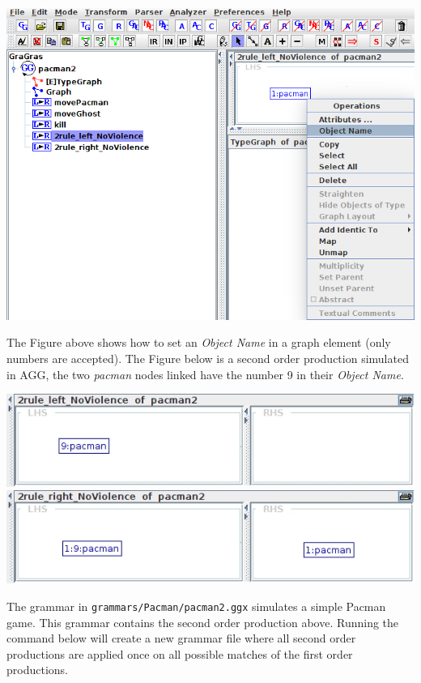 \documentclass[12pt]{article}
\begin{document}
{\noindent\centering\includegraphics[scale = 0.5]{objName.png}\\}

The Figure above shows how to set an \emph{Object Name} in a graph element (only numbers are accepted).
The Figure below is a second order production simulated in AGG, the two \emph{pacman} nodes linked have the number 9 in their \emph{Object Name}.

\begin{center}
\noindent\includegraphics[scale = 0.6]{noViolenceLeft.png}\\
\noindent\includegraphics[scale = 0.6]{noViolenceRight.png}\\
\end{center}

The grammar in \texttt{grammars/Pacman/pacman2.ggx} simulates a simple Pacman game.
This grammar contains the second order production above.
Running the command below will create a new grammar file where all second order productions are applied once on all possible matches of the first order productions.
\end{document}
